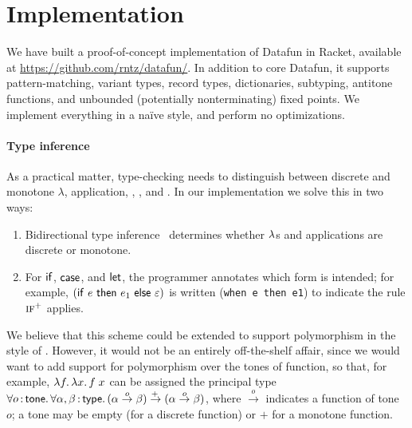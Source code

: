 \section{Implementation}
We have built a proof-of-concept implementation of Datafun in Racket, available
at \url{https://github.com/rntz/datafun/}. In addition to core Datafun,
it supports pattern-matching, variant types, record types, dictionaries,
subtyping, antitone functions, and unbounded (potentially nonterminating) fixed
points. We implement everything in a na\"ive style, and perform no
optimizations.

\paragraph{Type inference}
As a practical matter, type-checking needs to distinguish between discrete and
monotone $\lambda$, application, , , and . In our
implementation we solve this in two ways:
\begin{enumerate}
\item Bidirectional type inference~\cite{bidirectional} determines whether
  $\lambda$s and applications are discrete or monotone.

\item For $\mathsf{if}$, $\mathsf{case}$, and $\mathsf{let}$, the programmer annotates which
  form is intended; for example, $(\mathsf{if}~{e}~\mathsf{then}~{e_1}~\mathsf{else}~{\varepsilon})$ is written
  (\texttt{when e then e1}) to indicate the rule $\textsc{if}^+$ applies.
\end{enumerate}

We believe that this scheme could be extended to support polymorphism
in the style of \citet{dunfield-bidir}. However, it would not be an
entirely off-the-shelf affair, since we would want to add support for
polymorphism over the tones of function, so that, for example,
$\lambda f.\,\lambda x.\, f\;x$ can be assigned the principal type
$\forall o\,{:}\,\mathsf{tone}.\,\forall\alpha,\beta \,{:}\, \mathsf{type}.\,
(\alpha \overset{o}\to \beta) \overset{+\:}{\to} (\alpha \overset{o}\to \beta)$,
where $\overset{o}\to$ indicates a function of tone $o$; a tone may be
empty (for a discrete function) or ${+}$ for a monotone function.

% 
% 

